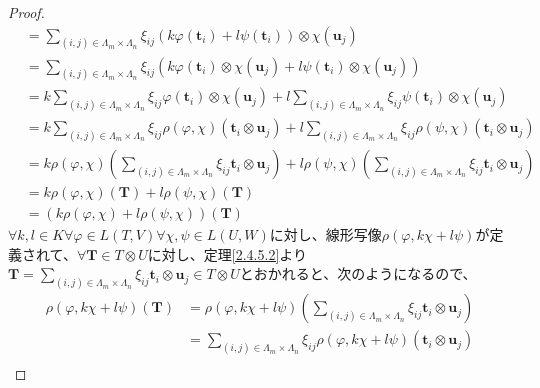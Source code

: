 \documentclass[dvipdfmx]{jsarticle}
\begin{document}
\begin{proof}
\begin{align*}
&= \sum_{(i,j) \in \varLambda_{m} \times \varLambda_{n}} {\xi_{ij}\left( k\varphi\left( \mathbf{t}_{i} \right) + l\psi\left( \mathbf{t}_{i} \right) \right) \otimes \chi\left( \mathbf{u}_{j} \right)}\\
&= \sum_{(i,j) \in \varLambda_{m} \times \varLambda_{n}} {\xi_{ij}\left( k\varphi\left( \mathbf{t}_{i} \right) \otimes \chi\left( \mathbf{u}_{j} \right) + l\psi\left( \mathbf{t}_{i} \right) \otimes \chi\left( \mathbf{u}_{j} \right) \right)}\\
&= k\sum_{(i,j) \in \varLambda_{m} \times \varLambda_{n}} {\xi_{ij}\varphi\left( \mathbf{t}_{i} \right) \otimes \chi\left( \mathbf{u}_{j} \right)} + l\sum_{(i,j) \in \varLambda_{m} \times \varLambda_{n}} {\xi_{ij}\psi\left( \mathbf{t}_{i} \right) \otimes \chi\left( \mathbf{u}_{j} \right)}\\
&= k\sum_{(i,j) \in \varLambda_{m} \times \varLambda_{n}} {\xi_{ij}\rho(\varphi,\chi)\left( \mathbf{t}_{i} \otimes \mathbf{u}_{j} \right)} + l\sum_{(i,j) \in \varLambda_{m} \times \varLambda_{n}} {\xi_{ij}\rho(\psi,\chi)\left( \mathbf{t}_{i} \otimes \mathbf{u}_{j} \right)}\\
&= k\rho(\varphi,\chi)\left( \sum_{(i,j) \in \varLambda_{m} \times \varLambda_{n}} {\xi_{ij}\mathbf{t}_{i} \otimes \mathbf{u}_{j}} \right) + l\rho(\psi,\chi)\left( \sum_{(i,j) \in \varLambda_{m} \times \varLambda_{n}} {\xi_{ij}\mathbf{t}_{i} \otimes \mathbf{u}_{j}} \right)\\
&= k\rho(\varphi,\chi)\left( \mathbf{T} \right) + l\rho(\psi,\chi)\left( \mathbf{T} \right)\\
&= \left( k\rho(\varphi,\chi) + l\rho(\psi,\chi) \right)\left( \mathbf{T} \right)
\end{align*}
$\forall k,l \in K\forall\varphi \in L(T,V)\forall\chi,\psi \in L(U,W)$に対し、線形写像$\rho(\varphi,k\chi + l\psi)$が定義されて、$\forall\mathbf{T} \in T \otimes U$に対し、定理\ref{2.4.5.2}より$\mathbf{T} = \sum_{(i,j) \in \varLambda_{m} \times \varLambda_{n}} {\xi_{ij}\mathbf{t}_{i} \otimes \mathbf{u}_{j}} \in T \otimes U$とおかれると、次のようになるので、
\begin{align*}
\rho(\varphi,k\chi + l\psi)\left( \mathbf{T} \right) &= \rho(\varphi,k\chi + l\psi)\left( \sum_{(i,j) \in \varLambda_{m} \times \varLambda_{n}} {\xi_{ij}\mathbf{t}_{i} \otimes \mathbf{u}_{j}} \right)\\
&= \sum_{(i,j) \in \varLambda_{m} \times \varLambda_{n}} {\xi_{ij}\rho(\varphi,k\chi + l\psi)\left( \mathbf{t}_{i} \otimes \mathbf{u}_{j} \right)}\\

\end{align*}
\end{proof}
\end{document}

